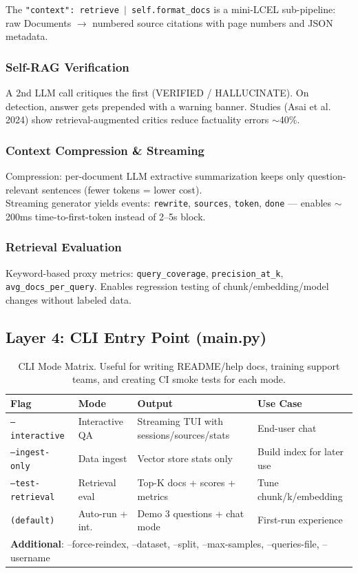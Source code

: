 \documentclass[12pt,a4paper]{article}
\begin{document}
The \texttt{"context": retrieve $|$ self.format\_docs} is a mini-LCEL sub-pipeline: raw Documents $\to$ numbered source citations with page numbers and JSON metadata.

\subsubsection{Self-RAG Verification}
A 2nd LLM call critiques the first (VERIFIED / HALLUCINATE). On detection, answer gets prepended with a warning banner. Studies (Asai et al. 2024) show retrieval-augmented critics reduce factuality errors $\sim$40\%.

\newpage

\subsubsection{Context Compression \& Streaming}
Compression: per-document LLM extractive summarization keeps only question-relevant sentences (fewer tokens = lower cost). \\
Streaming generator yields events: \texttt{rewrite}, \texttt{sources}, \texttt{token}, \texttt{done} — enables $\sim$200ms time-to-first-token instead of 2--5s block.

\subsubsection{Retrieval Evaluation}
Keyword-based proxy metrics: \texttt{query\_coverage}, \texttt{precision\_at\_k}, \texttt{avg\_docs\_per\_query}. Enables regression testing of chunk/embedding/model changes without labeled data.

\subsection{Layer 4: CLI Entry Point (main.py)}

\begin{table}[H]
\centering
\footnotesize
\begin{tabular}{@{}lp{2.5cm}lp{4.5cm}@{}}
\toprule
\textbf{Flag} & \textbf{Mode} & \textbf{Output} & \textbf{Use Case} \\
\midrule
\texttt{--interactive} & Interactive QA & Streaming TUI with sessions/sources/stats & End-user chat \\
\texttt{--ingest-only} & Data ingest & Vector store stats only & Build index for later use \\
\texttt{--test-retrieval} & Retrieval eval & Top-K docs + scores + metrics & Tune chunk/k/embedding \\
\texttt{(default)} & Auto-run + int. & Demo 3 questions + chat mode & First-run experience \\
\midrule
\multicolumn{4}{l}{\textbf{Additional}: --force-reindex, --dataset, --split, --max-samples, --queries-file, --username} \\
\bottomrule
\end{tabular}
\caption{CLI Mode Matrix. Useful for writing README/help docs, training support teams, and creating CI smoke tests for each mode.}
\end{table}
\end{document}
